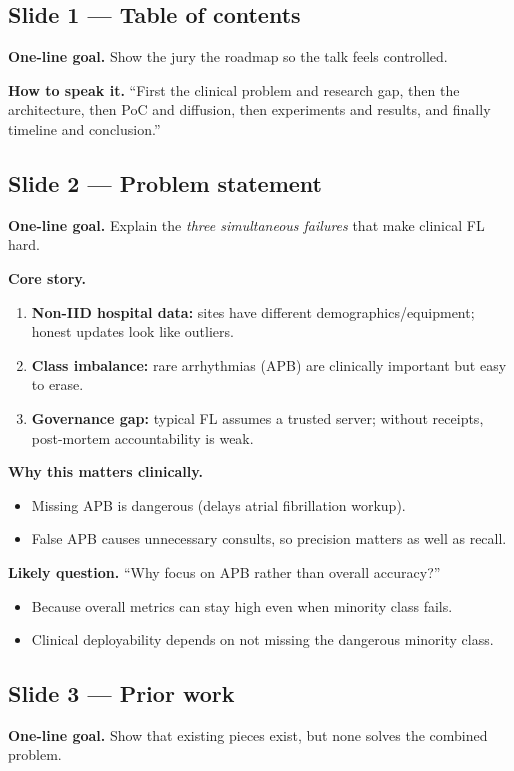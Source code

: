 \documentclass[11pt,a4paper]{article}
\begin{document}
\subsection{Slide 1 --- Table of contents}
\textbf{One-line goal.} Show the jury the roadmap so the talk feels controlled.

\textbf{How to speak it.} ``First the clinical problem and research gap, then the architecture, then PoC and diffusion, then experiments and results, and finally timeline and conclusion.''

\subsection{Slide 2 --- Problem statement}
\textbf{One-line goal.} Explain the \emph{three simultaneous failures} that make clinical FL hard.

\textbf{Core story.}
\begin{enumerate}
\item \textbf{Non-IID hospital data:} sites have different demographics/equipment; honest updates look like outliers.
\item \textbf{Class imbalance:} rare arrhythmias (APB) are clinically important but easy to erase.
\item \textbf{Governance gap:} typical FL assumes a trusted server; without receipts, post-mortem accountability is weak.
\end{enumerate}

\textbf{Why this matters clinically.}
\begin{itemize}
\item Missing APB is dangerous (delays atrial fibrillation workup).
\item False APB causes unnecessary consults, so precision matters as well as recall.
\end{itemize}

\textbf{Likely question.} ``Why focus on APB rather than overall accuracy?''
\begin{itemize}
\item Because overall metrics can stay high even when minority class fails.
\item Clinical deployability depends on not missing the dangerous minority class.
\end{itemize}

\subsection{Slide 3 --- Prior work}
\textbf{One-line goal.} Show that existing pieces exist, but none solves the combined problem.
\end{document}
